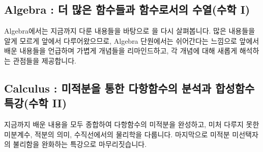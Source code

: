 \subsection{Algebra : 더 많은 함수들과 함수로서의 수열(수학 I)}
Algebra에서는 지금까지 다룬 내용들을 바탕으로 을 다시 살펴봅니다. 많은 내용들을 알게 모르게 앞에서 다루어왔으므로, Algebra 단원에서는 쉬어간다는 느낌으로 앞에서 배운 내용들을 언급하며 가볍게 개념들을 리마인드하고, 각 개념에 대해 새롭게 해석하는 관점들을 제공합니다.


\subsection{Calculus : 미적분을 통한 다항함수의 분석과 합성함수 특강(수학 II)}
지금까지 배운 내용을 모두 종합하여 다항함수의 미적분을 완성하고, 미처 다루지 못한 미분계수, 적분의 의미, 수직선에서의 물리학을 다룹니다. 마지막으로 미적분 미선택자의 불리함을 완화하는 특강으로 마무리짓습니다.



